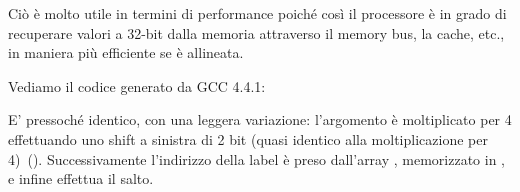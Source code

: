 Ciò è molto utile in termini di performance poiché così il processore è in grado di recuperare valori a 32-bit dalla memoria attraverso il memory bus, 
la cache, etc., in maniera più efficiente se è allineata.



\label{switch_lot_GCC}

Vediamo il codice generato da GCC 4.4.1:




E' pressoché identico, con una leggera variazione: l'argomento  è moltiplicato per 4
effettuando uno shift a sinistra di 2 bit (quasi identico alla moltiplicazione per 4)~().
Successivamente l'indirizzo della label è preso dall'array , memorizzato in 
\EAX, e infine  effettua il salto.

